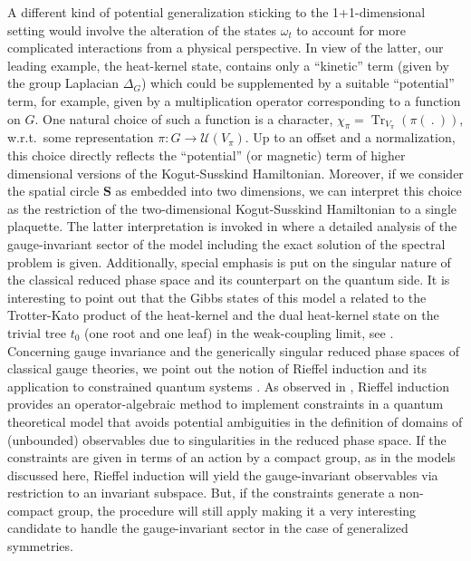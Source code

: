 \documentclass[a4paper,12pt]{amsart}
\numberwithin{equation}{section}
\theoremstyle{definition}
\newcommand{\fS}{\mathbf{S}}
\DeclareMathOperator{\Tr}{Tr}
\newcommand{\cU}{\mathcal U}
\begin{document}
{A different kind of potential generalization sticking to the 1+1-dimensional setting would involve the alteration of the states $\omega_{t}$ to account for more complicated interactions from a physical perspective. In view of the latter, our leading example, the heat-kernel state, contains only a ``kinetic'' term (given by the group Laplacian $\Delta_{G}$) which could be supplemented by a suitable ``potential'' term, for example, given by a multiplication operator corresponding to a function on $G$. One natural choice of such a function is a character, $\chi_{\pi} = \Tr_{V_{\pi}}(\pi(\ .\ ))$, w.r.t.~some representation $\pi:G\rightarrow\cU(V_{\pi})$. Up to an offset and a normalization, this choice directly reflects the ``potential'' (or magnetic) term of higher dimensional versions of the Kogut-Susskind Hamiltonian. Moreover, if we consider the spatial circle $\fS$ as embedded into two dimensions, we can interpret this choice as the restriction of the two-dimensional Kogut-Susskind Hamiltonian to a single plaquette. The latter interpretation is invoked in \cite{HuebschmannRudolphSchmidt09} where a detailed analysis of the gauge-invariant sector of the model including the exact solution of the spectral problem is given. Additionally, special emphasis is put on the singular nature of the classical reduced phase space and its counterpart on the quantum side. It is interesting to point out that the Gibbs states of this model a related to the Trotter-Kato product of the heat-kernel and the dual heat-kernel state on the trivial tree $t_{0}$ (one root and one leaf) in the weak-coupling limit, see \cite[Section 3]{Brot-Stottmeister-Phys}.}\\[0.1cm]
{Concerning gauge invariance and the generically singular reduced phase spaces of classical gauge theories, we point out the notion of Rieffel induction and its application to constrained quantum systems \cite{Landsman95}. As observed in \cite{Wren98}, Rieffel induction provides an operator-algebraic method to implement constraints in a quantum theoretical model that avoids potential ambiguities in the definition of domains of (unbounded) observables due to singularities in the reduced phase space. If the constraints are given in terms of an action by a compact group, as in the models discussed here, Rieffel induction will yield the gauge-invariant observables via restriction to an invariant subspace. But, if the constraints generate a non-compact group, the procedure will still apply making it a very interesting candidate to handle the gauge-invariant sector in the case of generalized symmetries.}\\[0.1cm]
\end{document}
